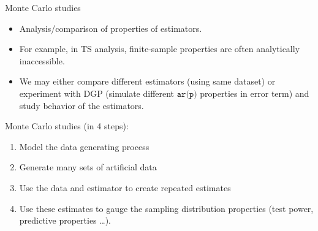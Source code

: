 \documentclass[usenames,dvipsnames]{beamer}
\begin{document}
\begin{frame}{Monte Carlo studies}
\begin{itemize}
    \item Analysis/comparison of properties of estimators.\\
    \item For example, in TS analysis, finite-sample properties are often analytically inaccessible.
    \item We may either compare different estimators (using same dataset) or experiment with DGP (simulate different $\texttt{ar(p)}$ properties in error term) and study behavior of the estimators.
\end{itemize}
\bigskip
Monte Carlo studies (in 4 steps):\\
\begin{enumerate}
\item Model the data generating process
\item Generate many sets of artificial data
\item Use the data and estimator to create repeated estimates
\item Use these estimates to gauge the sampling distribution properties (test power, predictive properties \dots).
\end{enumerate}
\end{frame}
\end{document}
